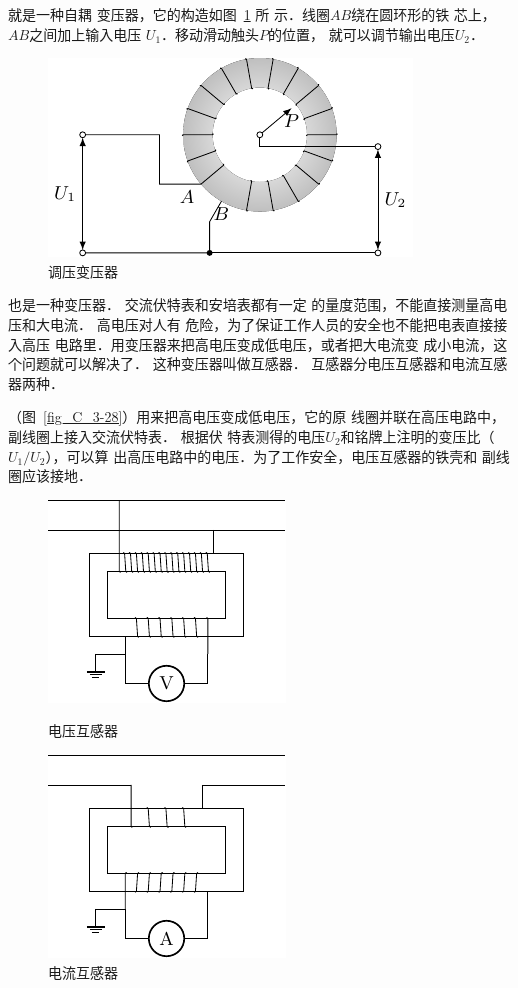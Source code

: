 就是一种自耦
变压器，它的构造如图~\ref{fig_C_3-27} 所
示．线圈$AB$绕在圆环形的铁
芯上，$AB$之间加上输入电压
$U_1$．移动滑动触头$P$的位置，
就可以调节输出电压$U_2$．
\begin{figure}[htbp]
    \centering
    \includegraphics{fig/C/3-27.pdf}
    \caption{调压变压器}\label{fig_C_3-27}
\end{figure}

也是一种变压器．
交流伏特表和安培表都有一定
的量度范围，不能直接测量高电压和大电流．
高电压对人有
危险，为了保证工作人员的安全也不能把电表直接接入高压
电路里．用变压器来把高电压变成低电压，或者把大电流变
成小电流，这个问题就可以解决了．
这种变压器叫做互感器．
互感器分电压互感器和电流互感器两种．

（图~\ref{fig_C_3-28}）用来把高电压变成低电压，它的原
线圈并联在高压电路中，副线圈上接入交流伏特表．
根据伏
特表测得的电压$U_2$和铭牌上注明的变压比（$U_1/U_2$），可以算
出高压电路中的电压．为了工作安全，电压互感器的铁壳和
副线圈应该接地．


\begin{figure}[htbp]
    \centering
    \begin{minipage}[t]{0.48\textwidth}
        \centering
        \includegraphics{fig/C/3-28.pdf}
        \caption{电压互感器}\label{fig_C_3-28}
    \end{minipage}
    \begin{minipage}[t]{0.48\textwidth}
        \centering
        \includegraphics{fig/C/3-29.pdf}
        \caption{电流互感器}\label{fig_C_3-29}
    \end{minipage}
\end{figure}

